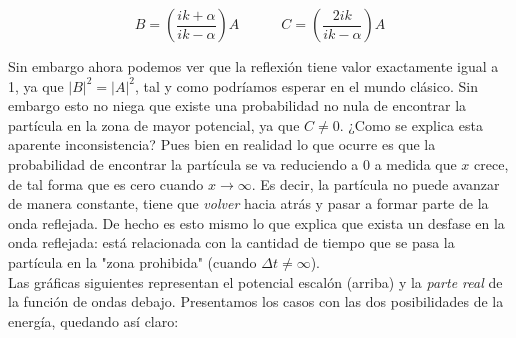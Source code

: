 \documentclass[12pt,a4paper]{article}
\numberwithin{equation}{section}
\numberwithin{figure}{section}
\newcommand{\parentesis}[1]{\left( #1  \right)}
\newcommand{\tquad}{\quad \quad \quad}
\begin{document}
\begin{equation}
B = \parentesis{\dfrac{ik+\alpha}{ik-\alpha}} A \tquad C = \parentesis{\dfrac{2ik}{ik-\alpha}} A
\end{equation}

Sin embargo ahora podemos ver que la reflexión tiene valor exactamente igual a 1, ya que $|B|^2 = |A|^2$, tal y como podríamos esperar en el mundo clásico. Sin embargo esto no niega que existe una probabilidad no nula de encontrar la partícula en la zona de mayor potencial, ya que $C \neq 0$. ¿Como se explica esta aparente inconsistencia? Pues bien en realidad lo que ocurre es que la probabilidad de encontrar la partícula se va reduciendo a 0 a medida que $x$ crece, de tal forma que es cero cuando $x \rightarrow \infty$. Es decir, la partícula no puede avanzar de manera constante, tiene que \textit{volver} hacia atrás y pasar a formar parte de la onda reflejada. De hecho es esto mismo lo que explica que exista un desfase en la onda reflejada: está relacionada con la cantidad de tiempo que se pasa la partícula en la "zona prohibida" (cuando $\Delta t \neq \infty$). \\

Las gráficas siguientes representan el potencial escalón (arriba) y la \textit{parte real} de la función de ondas debajo. Presentamos los casos con las dos posibilidades de la energía, quedando así claro:
\end{document}
